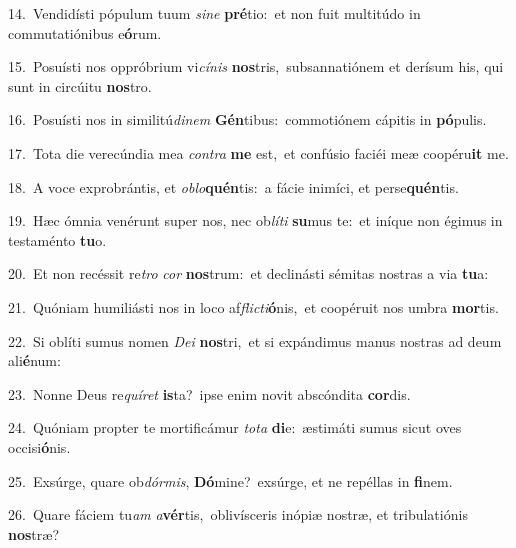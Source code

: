 {\numbfont\textcolor{\numbcolor}{14.}}~Vendidísti pópulum tuum \textit{si}\-\textit{ne} \textbf{pré}\-tio:~\star et non fuit multitúdo in commutatiónibus e\-\textbf{ó}\-rum.\par
{\numbfont\textcolor{\numbcolor}{15.}}~Posuísti nos oppróbrium vi\-\textit{cí}\-\textit{nis} \textbf{nos}\-tris,~\star subsannatiónem et derísum his, qui sunt in circúitu \textbf{nos}\-tro.\par
{\numbfont\textcolor{\numbcolor}{16.}}~Posuísti nos in similitú\-\textit{di}\-\textit{nem} \textbf{Gén}\-tibus:~\star commotiónem cápitis in \textbf{pó}\-pulis.\par
{\numbfont\textcolor{\numbcolor}{17.}}~Tota die verecúndia mea \textit{con}\-\textit{tra} \textbf{me} est,~\star et confúsio faciéi meæ coopéru\textbf{it} me.\par
{\numbfont\textcolor{\numbcolor}{18.}}~A voce exprobrántis, et \textit{ob}\-\textit{lo}\textbf{quén}tis:~\star a fácie inimíci, et perse\-\textbf{quén}\-tis.\par
{\numbfont\textcolor{\numbcolor}{19.}}~Hæc ómnia venérunt super nos, nec ob\-\textit{lí}\-\textit{ti} \textbf{su}\-mus te:~\star et iníque non égimus in testaménto \textbf{tu}\-o.\par
{\numbfont\textcolor{\numbcolor}{20.}}~Et non recéssit re\textit{tro} \textit{cor} \textbf{nos}\-trum:~\star et declinásti sémitas nostras a via \textbf{tu}\-a:\par
{\numbfont\textcolor{\numbcolor}{21.}}~Quóniam humiliásti nos in loco af\-\textit{flic}\-\textit{ti}\textbf{ó}nis,~\star et coopéruit nos umbra \textbf{mor}\-tis.\par
{\numbfont\textcolor{\numbcolor}{22.}}~Si oblíti sumus nomen \textit{De}\-\textit{i} \textbf{nos}\-tri,~\star et si expándimus manus nostras ad deum ali\-\textbf{é}\-num:\par
{\numbfont\textcolor{\numbcolor}{23.}}~Nonne Deus re\-\textit{quí}\-\textit{ret} \textbf{is}\-ta?~\star ipse enim novit abscóndita \textbf{cor}\-dis.\par
{\numbfont\textcolor{\numbcolor}{24.}}~Quóniam propter te mortificámur \textit{to}\-\textit{ta} \textbf{di}\-e:~\star æstimáti sumus sicut oves occisi\-\textbf{ó}\-nis.\par
{\numbfont\textcolor{\numbcolor}{25.}}~Exsúrge, quare ob\-\textit{dór}\-\textit{mis}, \textbf{Dó}\-mine?~\star exsúrge, et ne repéllas in \textbf{fi}\-nem.\par
{\numbfont\textcolor{\numbcolor}{26.}}~Quare fáciem tu\textit{am} \textit{a}\-\textbf{vér}tis,~\star oblivísceris inópiæ nostræ, et tribulatiónis \textbf{nos}\-træ?\par
